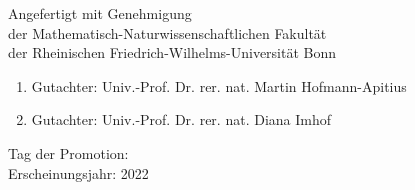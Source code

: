 \begin{flushleft} %
    \vspace*{8cm}
    \large

    Angefertigt mit Genehmigung \\
    der Mathematisch-Naturwissenschaftlichen Fakult\"at \\
    der Rheinischen Friedrich-Wilhelms-Universit\"at Bonn \\

    \vspace{1cm}
    \renewcommand{\baselinestretch}{1.6}
    
    \begin{enumerate}
        \item Gutachter: Univ.-Prof. Dr. rer. nat. Martin Hofmann-Apitius
        \item Gutachter: Univ.-Prof. Dr. rer. nat. Diana Imhof
        
    \end{enumerate}
    
   \vspace{1cm}

    Tag der Promotion: \\
    Erscheinungsjahr: 2022 \\

\end{flushleft}
\newpage\null\newpage

\setlength{\parskip}{1em} %
\renewcommand{\baselinestretch}{1.2} %


\newpage\null\newpage




    
\tableofcontents

\newpage\null\newpage
